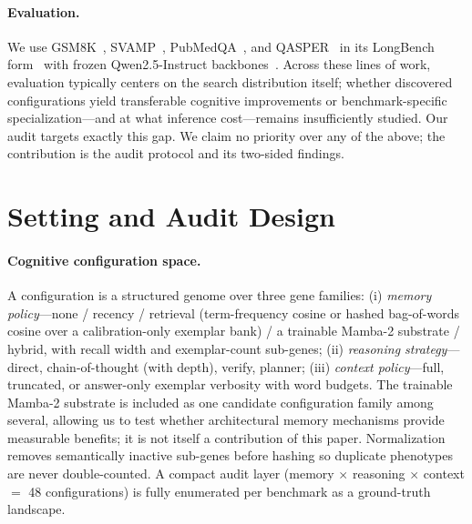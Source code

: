 \documentclass[11pt]{article}
\begin{document}
\paragraph{Evaluation.} We use GSM8K~\citep{cobbe2021gsm8k},
SVAMP~\citep{patel2021svamp}, PubMedQA~\citep{jin2019pubmedqa}, and
QASPER~\citep{dasigi2021qasper} in its LongBench form~\citep{bai2023longbench}
with frozen Qwen2.5-Instruct backbones~\citep{yang2024qwen25}. Across these
lines of work, evaluation typically centers on the search distribution
itself; whether discovered configurations yield transferable cognitive
improvements or benchmark-specific specialization---and at what inference
cost---remains insufficiently studied. Our audit targets exactly this gap.
We claim no
priority over any of the above; the contribution is the audit protocol and
its two-sided findings.

\section{Setting and Audit Design}

\paragraph{Cognitive configuration space.} A configuration is a structured
genome over three gene families: (i) \emph{memory policy}---none / recency
/ retrieval (term-frequency cosine or hashed bag-of-words cosine over a
calibration-only exemplar bank) / a trainable Mamba-2 substrate / hybrid,
with recall width and exemplar-count sub-genes; (ii) \emph{reasoning
strategy}---direct, chain-of-thought (with depth), verify, planner; (iii)
\emph{context policy}---full, truncated, or answer-only exemplar verbosity
with word budgets. The trainable Mamba-2 substrate is included as one
candidate configuration family among several, allowing us to test whether
architectural memory mechanisms provide measurable benefits; it is not
itself a contribution of this paper. Normalization removes semantically inactive sub-genes
before hashing so duplicate phenotypes are never double-counted. A compact
audit layer (memory $\times$ reasoning $\times$ context $=$ 48
configurations) is fully enumerated per benchmark as a ground-truth
landscape.
\end{document}
